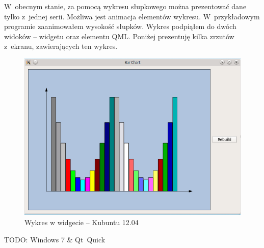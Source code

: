 W~obecnym stanie, za pomocą wykresu słupkowego można prezentować dane tylko z~jednej serii. Możliwa jest animacja elementów wykresu. W~przykładowym programie zaanimowałem wysokość słupków. Wykres podpiąłem do dwóch widoków -- widgetu oraz elementu QML. Poniżej prezentuję kilka zrzutów z~ekranu, zawierających ten wykres. 

\begin{figure}[H]
\centering
\includegraphics[scale=0.7]{img/BarChart_kubuntu.png}
\caption{Wykres w widgecie -- Kubuntu 12.04}\label{rys:bar:kubuntu}
\end{figure}

TODO: Windows 7 \& Qt~Quick




